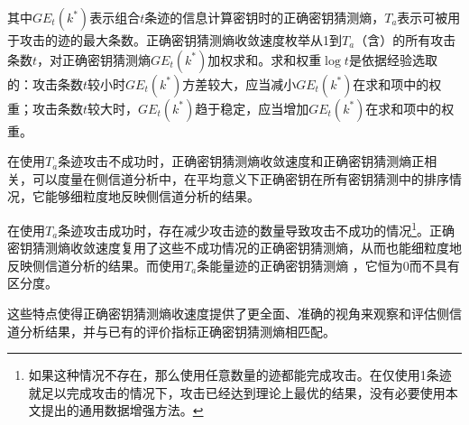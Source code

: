 {	\noindent 其中$GE_t(k^*)$表示组合$t$条迹的信息计算密钥时的正确密钥猜测熵，$T_a$表示可被用于攻击的迹的最大条数。正确密钥猜测熵收敛速度枚举从1到$T_a$（含）的所有攻击条数$t$，对正确密钥猜测熵$GE_t(k^*)$加权求和。求和权重$\log t$是依据经验选取的：攻击条数$t$较小时$GE_t(k^*)$方差较大，应当减小$GE_t(k^*)$在求和项中的权重；攻击条数$t$较大时，$GE_t(k^*)$趋于稳定，应当增加$GE_t(k^*)$在求和项中的权重。
	
	在使用$T_a$条迹攻击不成功时，正确密钥猜测熵收敛速度和正确密钥猜测熵正相关，可以度量在侧信道分析中，在平均意义下正确密钥在所有密钥猜测中的排序情况，它能够细粒度地反映侧信道分析的结果。
	
	在使用$T_a$条迹攻击成功时，存在减少攻击迹的数量导致攻击不成功的情况\footnote{如果这种情况不存在，那么使用任意数量的迹都能完成攻击。在仅使用1条迹就足以完成攻击的情况下，攻击已经达到理论上最优的结果，没有必要使用本文提出的通用数据增强方法。}。正确密钥猜测熵收敛速度复用了这些不成功情况的正确密钥猜测熵，从而也能细粒度地反映侧信道分析的结果。而使用$T_a$条能量迹的正确密钥猜测熵 ，它恒为0而不具有区分度。
	
	这些特点使得正确密钥猜测熵收速度提供了更全面、准确的视角来观察和评估侧信道分析结果，并与已有的评价指标正确密钥猜测熵相匹配。
	
}
